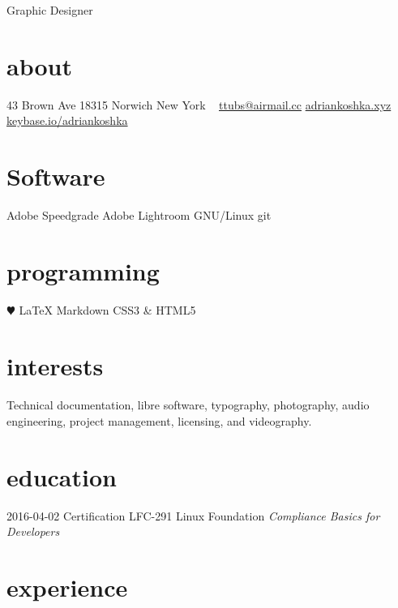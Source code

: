 \documentclass[]{friggeri-cv}
\begin{document}
       {Graphic Designer}


\begin{aside}
  \section{about}
    43 Brown Ave
    18315 Norwich
    New York
    ~
    \href{mailto:ttubbs@airmail.cc}{ttubs@airmail.cc}
    \href{https://adriankoshka.xyz}{adriankoshka.xyz}
    \href{https://keybase.io/Adriankoshka}{keybase.io/adriankoshka}
  \section{Software}
    Adobe Speedgrade
    Adobe Lightroom
    GNU/Linux
    git
  \section{programming}
    {\color{red} $\varheartsuit$} \LaTeX{}
    Markdown
    CSS3 \& HTML5
\end{aside}

\section{interests}

\paragraph{}
Technical documentation, libre software, typography, photography, audio
engineering, project management, licensing, and videography.
\par

\section{education}

\begin{entrylist}
  \entry
    {2016-04-02}
    {Certification {\normalfont LFC-291}}
    {Linux Foundation}
    {\emph{Compliance Basics for Developers}}
\end{entrylist}

\section{experience}
\end{document}
